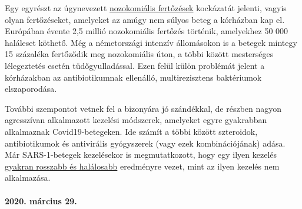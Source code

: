 Egy egyrészt az úgynevezett
\href{http://semmelweis.hu/korhazhigiene/altalanos/nozokomialis-fertozesek/}{nozokomiális
fertőzések} kockázatát jelenti, vagyis olyan fertőzéseket, amelyeket az
amúgy nem súlyos beteg a kórházban kap el. Európában évente 2,5 millió
nozokomiális fertőzés történik, amelyekhez 50 000 haláleset köthető. Még
a németországi intenzív állomásokon is a betegek mintegy 15 százaléka
fertőződik meg nozokomiális úton, a többi között mesterséges
lélegeztetés esetén tüdőgyulladással. Ezen felül külön problémát jelent
a kórházakban az antibiotikumnak ellenálló, multirezisztens baktériumok
elszaporodása.

További szempontot vetnek fel a bizonyára jó szándékkal, de részben
nagyon agresszívan alkalmazott kezelési módszerek, amelyeket egyre
gyakrabban alkalmaznak Covid19-betegeken. Ide számít a többi között
szteroidok, antibiotikumok és antivirális gyógyszerek (vagy ezek
kombinációjának) adása. Már SARS-1-betegek kezelésekor is
megmutatkozott, hogy egy ilyen kezelés
\href{https://www.sciencedaily.com/releases/2020/02/200206110703.htm}{gyakran
rosszabb és halálosabb} eredményre vezet, mint az ilyen kezelés nem
alkalmazása.

\hypertarget{2020-muxe1rcius-29}{%
\paragraph{2020. március 29.}\label{2020-muxe1rcius-29}}

